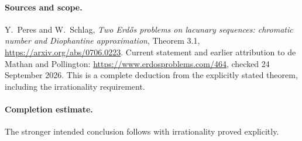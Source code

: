 \paragraph{Sources and scope.}
Y.~Peres and W.~Schlag, \emph{Two Erd\H{o}s problems on lacunary
sequences: chromatic number and Diophantine approximation},
Theorem 3.1, \url{https://arxiv.org/abs/0706.0223}.
Current statement and earlier attribution to de Mathan and Pollington:
\url{https://www.erdosproblems.com/464}, checked 24 September 2026.
This is a complete deduction from the explicitly stated theorem,
including the irrationality requirement.

\paragraph{Completion estimate.}
The stronger intended conclusion follows with irrationality proved explicitly.
